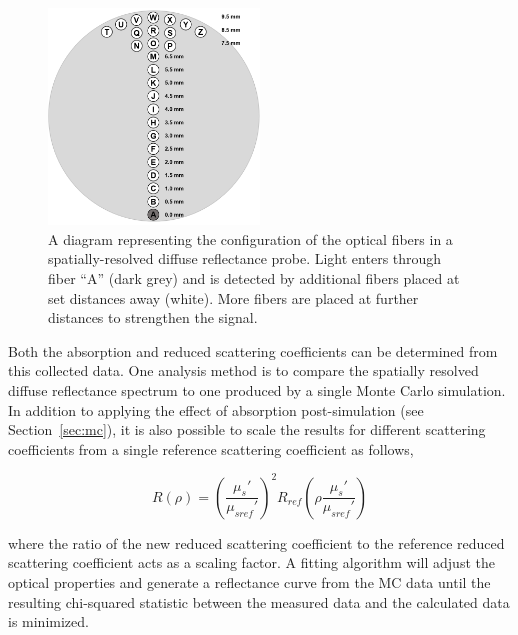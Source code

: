 \begin{figure}
	\centering \includegraphics[width=0.5\textwidth]{figures/intro-srdr.png}
	\caption[Probe for spatially-resolved diffuse reflectance]{\label{fig:intro-srdr}A diagram representing the configuration of the optical fibers in a spatially-resolved diffuse reflectance probe. Light enters through fiber “A” (dark grey) and is detected by additional fibers placed at set distances away (white). More fibers are placed at further distances to strengthen the signal.}
\end{figure}

Both the absorption and reduced scattering coefficients can be determined from this collected data. One analysis method is to compare the spatially resolved diffuse reflectance spectrum to one produced by a single Monte Carlo simulation. In addition to applying the effect of absorption post-simulation (see Section~\ref{sec:mc}), it is also possible to scale the results for different scattering coefficients from a single reference scattering coefficient as follows,\cite{Kienle1996a}

\begin{equation}
	R(\rho) = \left(\frac{\mu_s'}{\mu_{sref}'}\right)^2 R_{ref}\left(\rho\frac{\mu_s'}{\mu_{sref}'}\right)
\end{equation}

\noindent where the ratio of the new reduced scattering coefficient to the reference reduced scattering coefficient acts as a scaling factor. A fitting algorithm will adjust the optical properties and generate a reflectance curve from the MC data until the resulting chi-squared statistic between the measured data and the calculated data is minimized.

